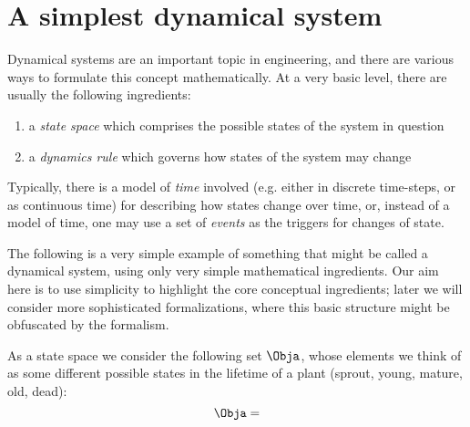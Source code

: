 
\section{A simplest dynamical system}
\label{sec:simplest-dyn-system}


Dynamical systems are an important topic in engineering, and there are various ways to formulate this concept mathematically. At a very basic level, there are usually the following ingredients: 
\begin{enumerate}
\item a \emph{state space} which comprises the possible states of the system in question
\item a \emph{dynamics rule} which governs how states of the system may change
\end{enumerate}
Typically, there is a model of \emph{time} involved (e.g. either in discrete time-steps, or as continuous time) for describing how states change over time, or, instead of a model of time, one may use a set of \emph{events} as the triggers for changes of state. 

The following is a very simple example of something that might be called a dynamical system, using only very simple mathematical ingredients. Our aim here is to use simplicity to highlight the core conceptual ingredients; later we will consider more sophisticated formalizations, where this basic structure might be obfuscated by the formalism.

As a state space we consider the following set $\Obja$, whose elements we think of as some different possible states in the lifetime of a plant (sprout, young, mature, old, dead): 
\begin{equation}
\Obja = 
\end{equation}
